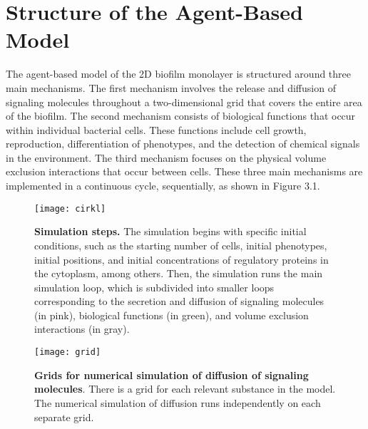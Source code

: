 
\chapter{Structure of the Agent-Based Model}\label{chap:contrib1}



The agent-based model of the 2D biofilm monolayer is structured around three main mechanisms. The first mechanism involves the release and diffusion of signaling molecules throughout a two-dimensional grid that covers the entire area of the biofilm. The second mechanism consists of biological functions that occur within individual bacterial cells. These functions include cell growth, reproduction, differentiation of phenotypes, and the detection of chemical signals in the environment. The third mechanism focuses on the physical volume exclusion interactions that occur between cells. These three main mechanisms are implemented in a continuous cycle, sequentially, as shown in Figure 3.1.

\begin{figure}[h]
    \centering
    \texttt{[image: cirkl]}
    \caption{\footnotesize \textbf{Simulation steps.} The simulation begins with specific initial conditions, such as the starting number of cells, initial phenotypes, initial positions, and initial concentrations of regulatory proteins in the cytoplasm, among others. Then, the simulation runs the main simulation loop, which is subdivided into smaller loops corresponding to the secretion and diffusion of signaling molecules (in pink), biological functions (in green), and volume exclusion interactions (in gray).}

\end{figure} 

\begin{figure}[h]
    \centering
    \texttt{[image: grid]}
    \caption{\footnotesize \textbf{Grids for numerical simulation of diffusion of signaling molecules}. There is a grid for each relevant substance in the model. The numerical simulation of diffusion runs independently on each separate grid.}

\end{figure}

